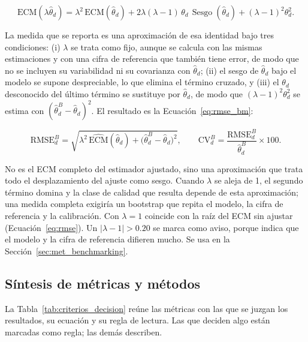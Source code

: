 \begin{equation}
    \text{ECM}(\lambda\hat{\theta}_d) = \lambda^2\,\text{ECM}(\hat{\theta}_d) + 2\lambda(\lambda-1)\,\theta_d\,\operatorname{Sesgo}(\hat{\theta}_d) + (\lambda-1)^2\theta_d^2 .
    \label{eq:ecm_bm_completo}
\end{equation}

La medida que se reporta es una aproximación de esa identidad bajo tres condiciones: (i) $\lambda$ se trata como fijo, aunque se calcula con las mismas estimaciones y con una cifra de referencia que también tiene error, de modo que no se incluyen su variabilidad ni su covarianza con $\hat{\theta}_d$; (ii) el sesgo de $\hat{\theta}_d$ bajo el modelo se supone despreciable, lo que elimina el término cruzado, y (iii) el $\theta_d$ desconocido del último término se sustituye por $\hat{\theta}_d$, de modo que $(\lambda-1)^2\theta_d^2$ se estima con $(\hat{\theta}^{B}_d - \hat{\theta}_d)^2$. El resultado es la Ecuación~\ref{eq:rmse_bm}:

\begin{equation}
    \text{RMSE}^{B}_d = \sqrt{\lambda^2\, \widehat{\text{ECM}}(\hat{\theta}_d) + \big(\hat{\theta}^{B}_d - \hat{\theta}_d\big)^2}, \qquad \text{CV}^{B}_d = \frac{\text{RMSE}^{B}_d}{\hat{\theta}^{B}_d}\times 100 .
    \label{eq:rmse_bm}
\end{equation}

No es el ECM completo del estimador ajustado, sino una aproximación que trata todo el desplazamiento del ajuste como sesgo. Cuando $\lambda$ se aleja de 1, el segundo término domina y la clase de calidad que resulta depende de esta aproximación; una medida completa exigiría un bootstrap que repita el modelo, la cifra de referencia y la calibración. Con $\lambda = 1$ coincide con la raíz del ECM sin ajustar (Ecuación~\ref{eq:rmse}). Un $|\lambda - 1| > 0.20$ se marca como aviso, porque indica que el modelo y la cifra de referencia difieren mucho. Se usa en la Sección~\ref{sec:met_benchmarking}.

\subsection{Síntesis de métricas y métodos}

La Tabla~\ref{tab:criterios_decision} reúne las métricas con las que se juzgan los resultados, su ecuación y su regla de lectura. Las que deciden algo están marcadas como regla; las demás describen.

